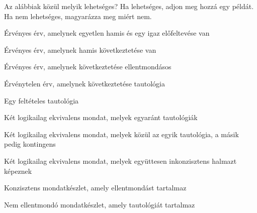 \solutions
\problempart
\label{pr.EnglishCombinations}
Az alábbiak közül melyik lehetséges? Ha lehetséges, adjon meg hozzá egy példát. Ha nem lehetséges, magyarázza meg miért nem.
\begin{earg}
\item Érvényes érv, amelynek egyetlen hamis és egy igaz előfeltevése van
\item Érvényes érv, amelynek hamis következtetése van
\item Érvényes érv, amelynek következtetése ellentmondásos
\item Érvénytelen érv, amelynek következtetése tautológia
\item Egy feltételes tautológia
\item Két logikailag ekvivalens mondat, melyek egyaránt tautológiák
\item Két logikailag ekvivalens mondat, melyek közül az egyik tautológia, a másik pedig kontingens
\item Két logikailag ekvivalens mondat, melyek együttesen inkonzisztens halmazt képeznek
\item Konzisztens mondatkészlet, amely ellentmondást tartalmaz
\item Nem ellentmondó mondatkészlet, amely tautológiát tartalmaz
\end{earg}


